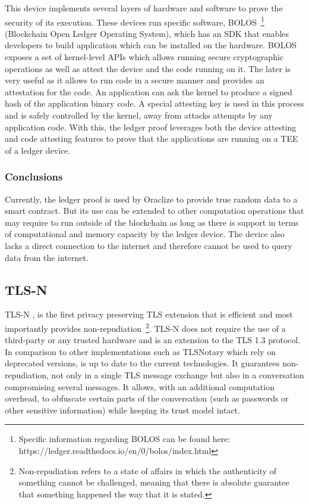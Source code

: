 This device implements several layers of hardware and software to prove the security of its execution. These devices run specific software, BOLOS~\footnote{Specific information regarding BOLOS can be found here: https://ledger.readthedocs.io/en/0/bolos/index.html} (Blockchain Open Ledger Operating System), which has an SDK that enables developers to build application which can be installed on the hardware. BOLOS exposes a set of kernel-level APIs which allows running secure cryptographic operations as well as attest the device and the code running on it. The later is very useful as it allows to run code in a secure manner and provides an attestation for the code. An application can ask the kernel to produce a signed hash of the application binary code. A special attesting key is used in this process and is safely controlled by the kernel, away from attacks attempts by any application code. With this, the ledger proof leverages both the device attesting and code attesting features to prove that the applications are running on a TEE of a ledger device.

\subsubsection{Conclusions}

Currently, the ledger proof is used by Oraclize to provide true random data to a smart contract. But its use can be extended to other computation operations that may require to run outside of the blockchain as long as there is support in terms of computational and memory capacity by the ledger device. The device also lacks a direct connection to the internet and therefore cannot be used to query data from the internet.


\subsection{TLS-N}

TLS-N \cite{Ritzdorf2017}, is the first privacy preserving TLS extension that is efficient and most importantly provides non-repudiation~\footnote{Non-repudiation refers to a state of affairs in which the authenticity of something cannot be challenged, meaning that there is absolute guarantee that something happened the way that it is stated.}. TLS-N does not require the use of a third-party or any trusted hardware and is an extension to the TLS 1.3 protocol. In comparison to other implementations such as TLSNotary which rely on deprecated versions, is up to date to the current technologies.
It guarantees non-repudiation, not only in a single TLS message exchange but also in a conversation compromising several messages. It allows, with an additional computation overhead, to obfuscate certain parts of the conversation (such as passwords or other sensitive information) while keeping its trust model intact.

